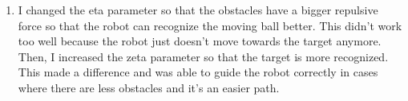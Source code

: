 \documentclass{article}
\begin{document}
\begin{enumerate}
    \item I changed the eta parameter so that the obstacles have a bigger repulsive force so that the robot can recognize the moving ball better. This didn't work too well because the robot just doesn't move towards the target anymore. Then, I increased the zeta parameter so that the target is more recognized. This made a difference and was able to guide the robot correctly in cases where there are less obstacles and it's an easier path.
\end{enumerate}

\newpage  









\end{document}
